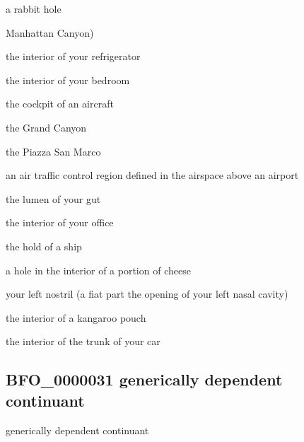 \documentclass[letterpaper,10pt,english]{sphinxmanual}
\begin{document}
\begin{sphinxShadowBox}

\sphinxAtStartPar
a rabbit hole

\sphinxAtStartPar
Manhattan Canyon)

\sphinxAtStartPar
the interior of your refrigerator

\sphinxAtStartPar
the interior of your bedroom

\sphinxAtStartPar
the cockpit of an aircraft

\sphinxAtStartPar
the Grand Canyon

\sphinxAtStartPar
the Piazza San Marco

\sphinxAtStartPar
an air traffic control region defined in the airspace above an airport

\sphinxAtStartPar
the lumen of your gut

\sphinxAtStartPar
the interior of your office

\sphinxAtStartPar
the hold of a ship

\sphinxAtStartPar
a hole in the interior of a portion of cheese

\sphinxAtStartPar
your left nostril (a fiat part \textendash{} the opening \textendash{} of your left nasal cavity)

\sphinxAtStartPar
the interior of a kangaroo pouch

\sphinxAtStartPar
the interior of the trunk of your car
\end{sphinxShadowBox}

\begin{sphinxShadowBox}

\sphinxAtStartPar
{}
\end{sphinxShadowBox}
\begin{quote}

\ignorespaces \end{quote}


\subsection{BFO\_0000031 \sphinxhyphen{} generically dependent continuant}
\label{\detokenize{doc-BFO_0000031:bfo-0000031-generically-dependent-continuant}}\label{\detokenize{doc-BFO_0000031:index-0}}\label{\detokenize{doc-BFO_0000031::doc}}
\begin{sphinxShadowBox}

\sphinxAtStartPar
generically dependent continuant
\end{sphinxShadowBox}
\end{document}
